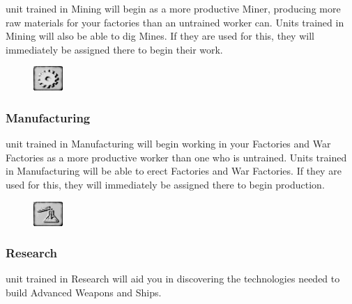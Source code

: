  unit trained in Mining will begin as a more productive Miner, producing more raw materials for your factories than an untrained worker can. Units trained in Mining will also be able to dig Mines. If they are used for this, they will immediately be assigned there to begin their work.

\begin{figure}
        \begin{center}
        \includegraphics[width=0.1\textwidth]{Tmanufacturing}
    \end{center}
    \vspace{-20pt}
\end{figure}

\subsubsection{\textsf{Manufacturing}}


 unit trained in Manufacturing will begin working in your Factories and War Factories as a more productive worker than one who is untrained. Units trained in Manufacturing will be able to erect Factories and War Factories. If they are used for this, they will immediately be assigned there to begin production.

\begin{figure}
        \begin{center}
        \includegraphics[width=0.1\textwidth]{Tresearch}
    \end{center}
    \vspace{-20pt}
\end{figure}

\subsubsection{\textsf{Research}}


 unit trained in Research will aid you in discovering the technologies needed to build Advanced Weapons and Ships.

